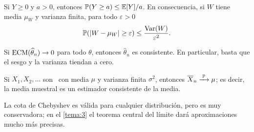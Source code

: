 \begin{lema}\label{lem:t2-chebyshev}
Si $Y\ge0$ y $a>0$, entonces $\mathbb{P}(Y\ge a)\le\mathbb{E}[Y]/a$. En consecuencia, si $W$ tiene media $\mu_W$ y varianza finita, para todo $\varepsilon>0$
\[
\mathbb{P}(\lvert W-\mu_W\rvert\ge\varepsilon)\le\frac{\operatorname{Var}(W)}{\varepsilon^{2}}.
\]
\end{lema}

\begin{proposicion}\label{prop:t2-ecm-consistencia}
Si $\operatorname{ECM}(\widehat\theta_n)\to0$ para todo $\theta$, entonces $\widehat\theta_n$ es consistente. En particular, basta que el sesgo y la varianza tiendan a cero.
\end{proposicion}

\begin{teorema}\label{teo:t2-lgn}
Si $X_1,X_2,\dots$ son \iid\ con media $\mu$ y varianza finita $\sigma^{2}$, entonces $\overline{X}_n\xrightarrow{\;\mathbb{P}\;}\mu$; es decir, la media muestral es un estimador consistente de la media.
\end{teorema}

La cota de Chebyshev es válida para cualquier distribución, pero es muy conservadora; en el \cref{tema:3} el teorema central del límite dará aproximaciones mucho más precisas.

\addtocounter{definicion}{1}%

\addtocounter{definicion}{1}%

